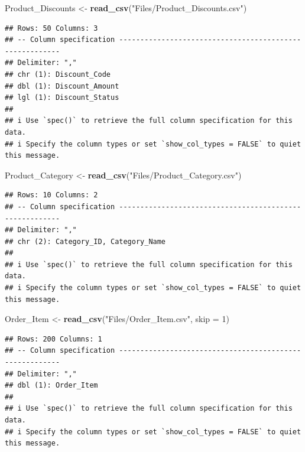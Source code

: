 \documentclass[
]{article}
\newenvironment{Shaded}{\begin{snugshade}}{\end{snugshade}}
\newcommand{\AttributeTok}[1]{\textcolor[rgb]{0.13,0.29,0.53}{#1}}
\newcommand{\DecValTok}[1]{\textcolor[rgb]{0.00,0.00,0.81}{#1}}
\newcommand{\FunctionTok}[1]{\textcolor[rgb]{0.13,0.29,0.53}{\textbf{#1}}}
\newcommand{\NormalTok}[1]{#1}
\newcommand{\OtherTok}[1]{\textcolor[rgb]{0.56,0.35,0.01}{#1}}
\newcommand{\StringTok}[1]{\textcolor[rgb]{0.31,0.60,0.02}{#1}}
\begin{document}
\begin{Shaded}
\begin{Highlighting}[]
\NormalTok{Product\_Discounts }\OtherTok{\textless{}{-}} \FunctionTok{read\_csv}\NormalTok{(}\StringTok{"Files/Product\_Discounts.csv"}\NormalTok{)}
\end{Highlighting}
\end{Shaded}

\begin{verbatim}
## Rows: 50 Columns: 3
## -- Column specification --------------------------------------------------------
## Delimiter: ","
## chr (1): Discount_Code
## dbl (1): Discount_Amount
## lgl (1): Discount_Status
## 
## i Use `spec()` to retrieve the full column specification for this data.
## i Specify the column types or set `show_col_types = FALSE` to quiet this message.
\end{verbatim}

\begin{Shaded}
\begin{Highlighting}[]
\NormalTok{Product\_Category }\OtherTok{\textless{}{-}} \FunctionTok{read\_csv}\NormalTok{(}\StringTok{"Files/Product\_Category.csv"}\NormalTok{)}
\end{Highlighting}
\end{Shaded}

\begin{verbatim}
## Rows: 10 Columns: 2
## -- Column specification --------------------------------------------------------
## Delimiter: ","
## chr (2): Category_ID, Category_Name
## 
## i Use `spec()` to retrieve the full column specification for this data.
## i Specify the column types or set `show_col_types = FALSE` to quiet this message.
\end{verbatim}

\begin{Shaded}
\begin{Highlighting}[]
\NormalTok{Order\_Item }\OtherTok{\textless{}{-}} \FunctionTok{read\_csv}\NormalTok{(}\StringTok{"Files/Order\_Item.csv"}\NormalTok{, }
    \AttributeTok{skip =} \DecValTok{1}\NormalTok{)}
\end{Highlighting}
\end{Shaded}

\begin{verbatim}
## Rows: 200 Columns: 1
## -- Column specification --------------------------------------------------------
## Delimiter: ","
## dbl (1): Order_Item
## 
## i Use `spec()` to retrieve the full column specification for this data.
## i Specify the column types or set `show_col_types = FALSE` to quiet this message.
\end{verbatim}
\end{document}
